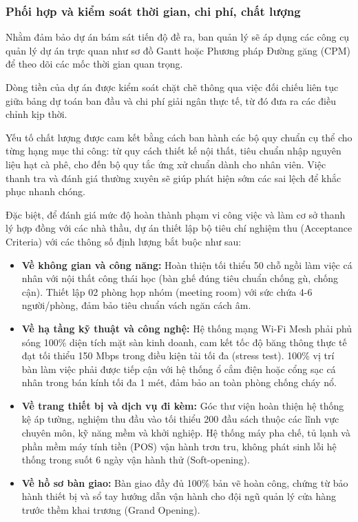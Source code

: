 \documentclass[a4paper,12pt]{article}
\begin{document}
\subsubsection{Phối hợp và kiểm soát thời gian, chi phí, chất lượng}
Nhằm đảm bảo dự án bám sát tiến độ đề ra, ban quản lý sẽ áp dụng các công cụ quản lý dự án trực quan như sơ đồ Gantt hoặc Phương pháp Đường găng (CPM) để theo dõi các mốc thời gian quan trọng.

Dòng tiền của dự án được kiểm soát chặt chẽ thông qua việc đối chiếu liên tục giữa bảng dự toán ban đầu và chi phí giải ngân thực tế, từ đó đưa ra các điều chỉnh kịp thời. 

Yếu tố chất lượng được cam kết bằng cách ban hành các bộ quy chuẩn cụ thể cho từng hạng mục thi công: từ quy cách thiết kế nội thất, tiêu chuẩn nhập nguyên liệu hạt cà phê, cho đến bộ quy tắc ứng xử chuẩn dành cho nhân viên. Việc thanh tra và đánh giá thường xuyên sẽ giúp phát hiện sớm các sai lệch để khắc phục nhanh chóng.

Đặc biệt, để đánh giá mức độ hoàn thành phạm vi công việc và làm cơ sở thanh lý hợp đồng với các nhà thầu, dự án thiết lập bộ tiêu chí nghiệm thu (Acceptance Criteria) với các thông số định lượng bắt buộc như sau:
\begin{itemize}
    \item \textbf{Về không gian và công năng:} Hoàn thiện tối thiểu 50 chỗ ngồi làm việc cá nhân với nội thất công thái học (bàn ghế đúng tiêu chuẩn chống gù, chống cận). Thiết lập 02 phòng họp nhóm (meeting room) với sức chứa 4-6 người/phòng, đảm bảo tiêu chuẩn vách ngăn cách âm.
    \item \textbf{Về hạ tầng kỹ thuật và công nghệ: }Hệ thống mạng Wi-Fi Mesh phải phủ sóng 100\% diện tích mặt sàn kinh doanh, cam kết tốc độ băng thông thực tế đạt tối thiểu 150 Mbps trong điều kiện tải tối đa (stress test). 100\% vị trí bàn làm việc phải được tiếp cận với hệ thống ổ cắm điện hoặc cổng sạc cá nhân trong bán kính tối đa 1 mét, đảm bảo an toàn phòng chống cháy nổ.
    \item \textbf{Về trang thiết bị và dịch vụ đi kèm: }Góc thư viện hoàn thiện hệ thống kệ áp tường, nghiệm thu đầu vào tối thiểu 200 đầu sách thuộc các lĩnh vực chuyên môn, kỹ năng mềm và khởi nghiệp. Hệ thống máy pha chế, tủ lạnh và phần mềm máy tính tiền (POS) vận hành trơn tru, không phát sinh lỗi hệ thống trong suốt 6 ngày vận hành thử (Soft-opening).
    \item \textbf{Về hồ sơ bàn giao: }Bàn giao đầy đủ 100\% bản vẽ hoàn công, chứng từ bảo hành thiết bị và sổ tay hướng dẫn vận hành cho đội ngũ quản lý cửa hàng trước thềm khai trương (Grand Opening).
\end{itemize}
\end{document}
